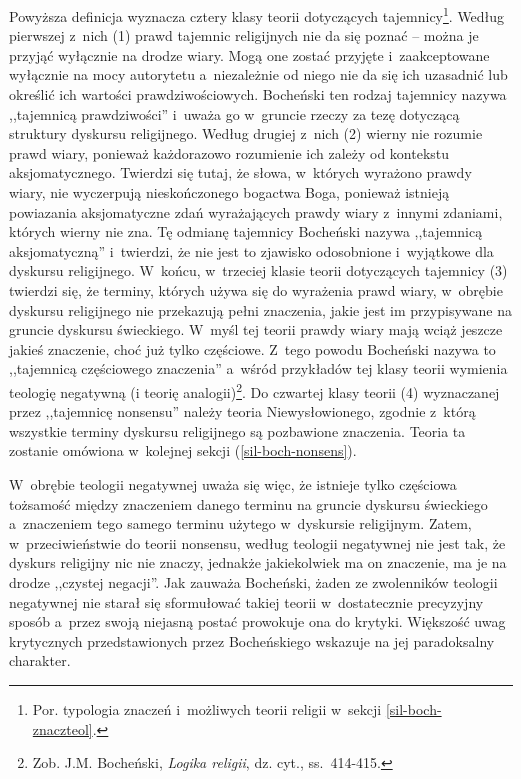 Powyższa definicja wyznacza cztery klasy teorii dotyczących tajemnicy\footnote{Por. typologia znaczeń i~możliwych teorii religii w~sekcji \ref{sil-boch-znaczteol}.}. Według pierwszej z~nich (1) prawd tajemnic religijnych nie da się poznać -- można je przyjąć wyłącznie na drodze wiary. Mogą one zostać przyjęte i~zaakceptowane wyłącznie na mocy autorytetu a~niezależnie od niego nie da się ich uzasadnić lub określić ich wartości prawdziwościowych. Bocheński ten rodzaj tajemnicy nazywa ,,tajemnicą prawdziwości'' i~uważa go w~gruncie rzeczy za tezę dotyczącą struktury dyskursu religijnego. Według drugiej z~nich (2) wierny nie rozumie prawd wiary, ponieważ każdorazowo rozumienie ich zależy od kontekstu aksjomatycznego. Twierdzi się tutaj, że słowa, w~których wyrażono prawdy wiary, nie wyczerpują nieskończonego bogactwa Boga, ponieważ istnieją powiazania aksjomatyczne zdań wyrażających prawdy wiary z~innymi zdaniami, których wierny nie zna. Tę odmianę tajemnicy Bocheński nazywa ,,tajemnicą aksjomatyczną'' i~twierdzi, że nie jest to zjawisko odosobnione i~wyjątkowe dla dyskursu religijnego. W~końcu, w~trzeciej klasie teorii dotyczących tajemnicy (3) twierdzi się, że terminy, których używa się do wyrażenia prawd wiary, w~obrębie dyskursu religijnego nie przekazują pełni znaczenia, jakie jest im przypisywane na gruncie dyskursu świeckiego. W~myśl tej teorii prawdy wiary mają wciąż jeszcze jakieś znaczenie, choć już tylko częściowe. Z~tego powodu Bocheński nazywa to ,,tajemnicą częściowego znaczenia'' a~wśród przykładów tej klasy teorii wymienia teologię negatywną (i teorię analogii)\footnote{Zob. J.M. Bocheński, \textit{Logika religii}, dz. cyt., ss.~414-415.}. Do czwartej klasy teorii (4) wyznaczanej przez ,,tajemnicę nonsensu'' należy teoria Niewysłowionego, zgodnie z~którą wszystkie terminy dyskursu religijnego są pozbawione znaczenia. Teoria ta zostanie omówiona w~kolejnej sekcji (\ref{sil-boch-nonsens}).

W~obrębie teologii negatywnej uważa się więc, że istnieje tylko częściowa tożsamość między znaczeniem danego terminu na gruncie dyskursu świeckiego a~znaczeniem tego samego terminu użytego w~dyskursie religijnym. Zatem, w~przeciwieństwie do teorii nonsensu, według teologii negatywnej nie jest tak, że dyskurs religijny nic nie znaczy, jednakże jakiekolwiek ma on znaczenie, ma je na drodze ,,czystej negacji''. Jak zauważa Bocheński, żaden ze zwolenników teologii negatywnej nie starał się sformułować takiej teorii w~dostatecznie precyzyjny sposób a~przez swoją niejasną postać prowokuje ona do krytyki. Większość uwag krytycznych przedstawionych przez Bocheńskiego wskazuje na jej paradoksalny charakter.

